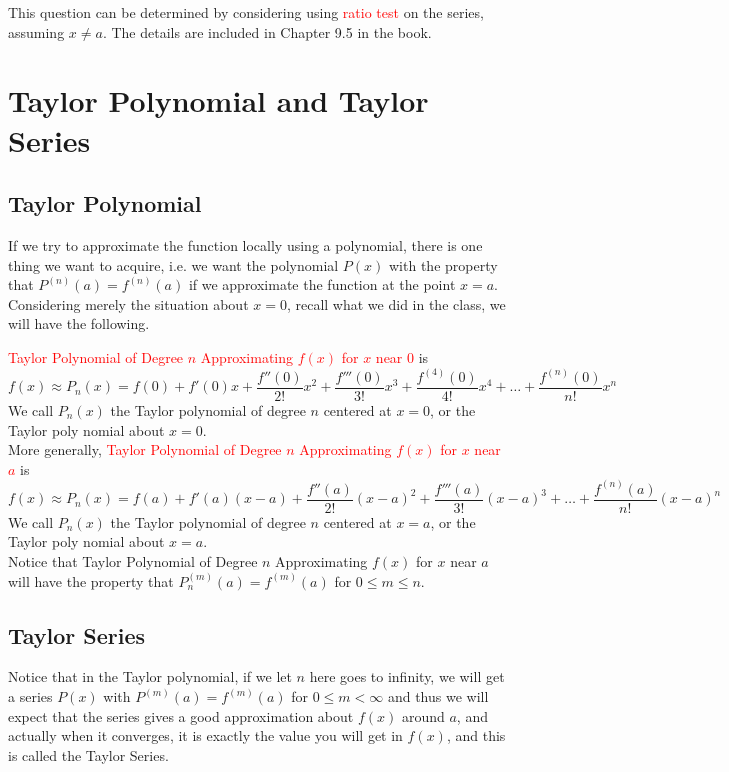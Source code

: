 \documentclass[12pt]{article}
\theoremstyle{definition}
\theoremstyle{definition}
\theoremstyle{remark}
\theoremstyle{definition}
\theoremstyle{definition}
\theoremstyle{definition}
\begin{document}
This question can be determined by considering using \textcolor{red}{ratio test} on the series, assuming $x\neq a$.
The details are included in Chapter 9.5 in the book.

\section{Taylor Polynomial and Taylor Series}
\subsection{Taylor Polynomial}
If we try to approximate the function locally using a polynomial, there is one thing we want to acquire, i.e. we want the polynomial $P(x)$ with the property that $P^{(n)}(a)=f^{(n)}(a)$ if we approximate the function at the point $x=a$. Considering merely the situation about $x=0$, recall what we did in the class, we will have the following.

\textcolor{red}{Taylor Polynomial of Degree $n$ Approximating $f(x)$ for $x$ near $0$} is \[f(x) \approx P_n(x)
	= f(0) + f'(0)x + \frac{f''(0)}{2!}x^2 + \frac{f'''(0)}{3!}x^3 + \frac{f^{(4)}(0)}{4!} x^4 + \ldots + \frac{f^{(n)}(0)}{n!} x^n\]
	We call $P_n(x)$ the Taylor polynomial of degree $n$ centered at $x = 0$, or the Taylor poly
	nomial about $x = 0$.\\
	
More generally, \textcolor{red}{Taylor Polynomial of Degree $n$ Approximating $f(x)$ for $x$ near $a$} is \[f(x) \approx P_n(x)
= f(a) + f'(a)(x-a) + \frac{f''(a)}{2!}(x-a)^2 + \frac{f'''(a)}{3!}(x-a)^3  + \ldots + \frac{f^{(n)}(a)}{n!} (x-a)^n\]
We call $P_n(x)$ the Taylor polynomial of degree $n$ centered at $x = a$, or the Taylor poly
nomial about $x =a$.\\

Notice that Taylor Polynomial of Degree $n$ Approximating $f(x)$ for $x$ near $a$ will have the property that $P_n^{(m)}(a)=f^{(m)}(a)$ for $0 \leq m \leq n$.

\subsection{Taylor Series}

Notice that in the Taylor polynomial, if we let $n$ here goes to infinity, we will get a series $P(x)$ with $P^{(m)}(a)=f^{(m)}(a)$ for $0 \leq m < \infty$ and thus we will expect that the series gives a good approximation about $f(x)$ around $a$, and actually when it converges, it is exactly the value you will get in $f(x)$, and this is called the Taylor Series.
\end{document}
